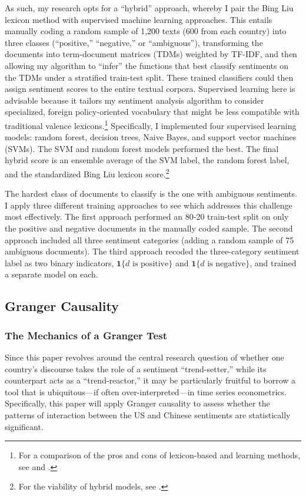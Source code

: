 \documentclass[12pt,letterpaper]{article}
\begin{document}
As such, my research opts for a ``hybrid'' approach, whereby I pair the Bing Liu lexicon method with supervised machine learning approaches. This entails manually coding a random sample of 1,200 texts (600 from each country) into three classes (``positive,'' ``negative,'' or ``ambiguous''), transforming the documents into term-document matrices (TDMs) weighted by TF-IDF, and then allowing my algorithm to ``infer'' the functions that best classify sentiments on the TDMs under a stratified train-test split. These trained classifiers could then assign sentiment scores to the entire textual corpora. Supervised learning here is advisable because it tailors my sentiment analysis algorithm to consider specialized, foreign policy-oriented vocabulary that might be less compatible with traditional valence lexicons.\footnote{For a comparison of the pros and cons of lexicon-based and learning methods, see \textcite{kolchyna2015} and \textcite[444--45]{verma2018}.} Specifically, I implemented four supervised learning models: random forest, decision trees, Naive Bayes, and support vector machines (SVMs). The SVM and random forest models performed the best. The final hybrid score is an ensemble average of the SVM label, the random forest label, and the standardized Bing Liu lexicon score.\footnote{For the viability of hybrid models, see \textcite{dandrea2015}.}

The hardest class of documents to classify is the one with ambiguous sentiments. I apply three different training approaches to see which addresses this challenge most effectively. The first approach performed an 80-20 train-test split on only the positive and negative documents in the manually coded sample. The second approach included all three sentiment categories (adding a random sample of 75 ambiguous documents). The third approach recoded the three-category sentiment label as two binary indicators, $\mathbf{1}\{d \text{ is positive}\}$ and $\mathbf{1}\{d \text{ is negative}\}$, and trained a separate model on each.

\subsection{Granger Causality}

\subsubsection*{The Mechanics of a Granger Test}

Since this paper revolves around the central research question of whether one country's discourse takes the role of a sentiment ``trend-setter,'' while its counterpart acts as a ``trend-reactor,'' it may be particularly fruitful to borrow a tool that is ubiquitous---if often over-interpreted---in time series econometrics. Specifically, this paper will apply Granger causality to assess whether the patterns of interaction between the US and Chinese sentiments are statistically significant.
\end{document}
